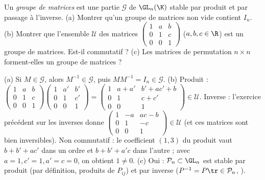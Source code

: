 \begin{exo}
Un \emph{groupe de matrices} est une partie $\mathcal G$ de $\GL_n(\K)$ stable par produit et par passage à l'inverse. (a) Montrer qu'un groupe de matrices non vide contient $I_n$. (b) Montrer que l'ensemble $\mathcal U$ des matrices $\begin{pmatrix}1&a&b\\0&1&c\\0&0&1\end{pmatrix}$ ($a,b,c\in\R$) est un groupe de matrices. Est-il commutatif ? (c) Les matrices de permutation $n\times n$ forment-elles un groupe de matrices ?
\begin{corrige}
(a) Si $M\in\mathcal G$, alors $M^{-1}\in\mathcal G$, puis $MM^{-1}=I_n\in\mathcal G$.
(b) Produit : $\begin{pmatrix}1&a&b\\0&1&c\\0&0&1\end{pmatrix}\begin{pmatrix}1&a'&b'\\0&1&c'\\0&0&1\end{pmatrix}=\begin{pmatrix}1&a+a'&b'+ac'+b\\0&1&c+c'\\0&0&1\end{pmatrix}\in\mathcal U$. Inverse : l'exercice précédent sur les inverses donne $\begin{pmatrix}1&-a&ac-b\\0&1&-c\\0&0&1\end{pmatrix}\in\mathcal U$ (et ces matrices sont bien inversibles). Non commutatif : le coefficient $(1,3)$ du produit vaut $b+b'+ac'$ dans un ordre et $b+b'+a'c$ dans l'autre ; avec $a=1,c'=1,a'=c=0$, on obtient $1\neq0$.
(c) Oui : $\mathcal P_n\subset\GL_n$ est stable par produit (par définition, produits de $P_{ij}$) et par inverse ($P^{-1}=P\tr\in\mathcal P_n$, ).
\end{corrige}
\end{exo}
